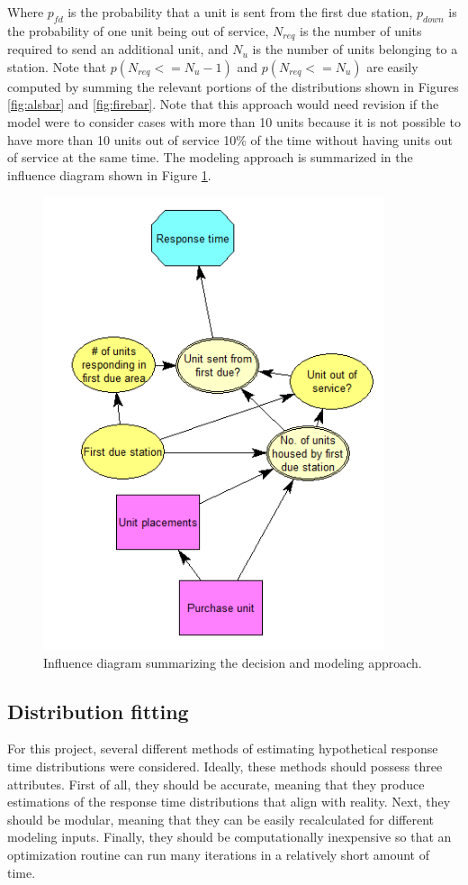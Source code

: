 \documentclass[article]{proc}
\begin{document}
Where $p_{fd}$ is the probability that a unit is sent from the first due station, $p_{down}$ is the probability of one unit being out of service, $N_{req}$ is the number of units required to send an additional unit, and $N_u$ is the number of units belonging to a station. Note that $p(N_{req} <= N_u-1)$ and $p(N_{req} <= N_u)$ are easily computed by summing the relevant portions of the distributions shown in Figures \ref{fig:alsbar} and \ref{fig:firebar}. Note that this approach would need revision if the model were to consider cases with more than 10 units because it is not possible to have more than 10 units out of service 10\% of the time without having units out of service at the same time. The modeling approach is summarized in the influence diagram shown in Figure \ref{fig:influence}.

\begin{figure}[!htb]
  \centering
  \includegraphics[width=10cm,keepaspectratio]{Figures/influence.png}
  \caption{Influence diagram summarizing the decision and modeling approach.}
  \label{fig:influence}
\end{figure}


\subsection{Distribution fitting}
For this project, several different methods of estimating hypothetical response time distributions were considered. Ideally, these methods should possess three attributes. First of all, they should be accurate, meaning that they produce estimations of the response time distributions that align with reality. Next, they should be modular, meaning that they can be easily recalculated for different modeling inputs. Finally, they should be computationally inexpensive so that an optimization routine can run many iterations in a relatively short amount of time.
\end{document}
